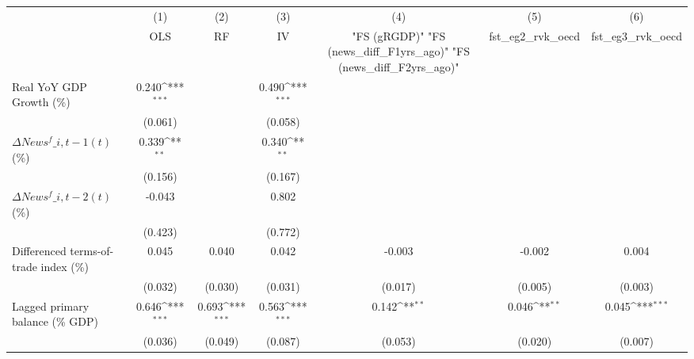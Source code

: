 {
\def\sym#1{\ifmmode^{#1}\else\(^{#1}\)\fi}
\begin{tabular}{l*{6}{c}}
\toprule
                    &\multicolumn{1}{c}{(1)}&\multicolumn{1}{c}{(2)}&\multicolumn{1}{c}{(3)}&\multicolumn{1}{c}{(4)}&\multicolumn{1}{c}{(5)}&\multicolumn{1}{c}{(6)}\\
                    &\multicolumn{1}{c}{OLS}&\multicolumn{1}{c}{RF}&\multicolumn{1}{c}{IV}&\multicolumn{1}{c}{ "FS (gRGDP)"  "FS (news\_diff\_F1yrs\_ago)"  "FS (news\_diff\_F2yrs\_ago)" }&\multicolumn{1}{c}{fst\_eg2\_rvk\_oecd}&\multicolumn{1}{c}{fst\_eg3\_rvk\_oecd}\\
\midrule
Real YoY GDP Growth (\%)&       0.240\sym{***}&                     &       0.490\sym{***}&                     &                     &                     \\
                    &     (0.061)         &                     &     (0.058)         &                     &                     &                     \\
\addlinespace
$ \Delta News^f\_{i,t-1}(t)$ (\%)&       0.339\sym{**} &                     &       0.340\sym{**} &                     &                     &                     \\
                    &     (0.156)         &                     &     (0.167)         &                     &                     &                     \\
\addlinespace
$ \Delta News^f\_{i,t-2}(t)$ (\%)&      -0.043         &                     &       0.802         &                     &                     &                     \\
                    &     (0.423)         &                     &     (0.772)         &                     &                     &                     \\
\addlinespace
Differenced terms-of-trade index (\%)&       0.045         &       0.040         &       0.042         &      -0.003         &      -0.002         &       0.004         \\
                    &     (0.032)         &     (0.030)         &     (0.031)         &     (0.017)         &     (0.005)         &     (0.003)         \\
\addlinespace
Lagged primary balance (\% GDP)&       0.646\sym{***}&       0.693\sym{***}&       0.563\sym{***}&       0.142\sym{**} &       0.046\sym{**} &       0.045\sym{***}\\
                    &     (0.036)         &     (0.049)         &     (0.087)         &     (0.053)         &     (0.020)         &     (0.007)         \\

\end{tabular}}
